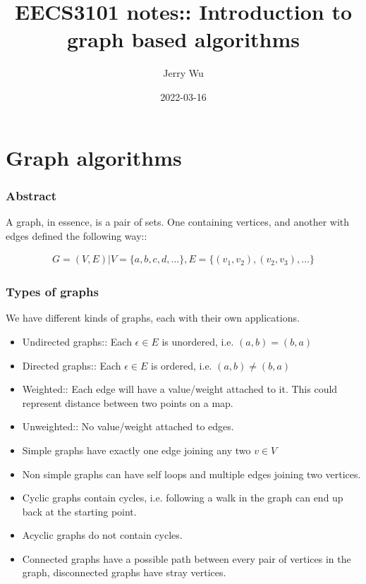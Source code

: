 \documentclass[12pt]{book}
\title{EECS3101 notes:: Introduction to graph based algorithms}
\author{Jerry Wu}
\date{2022-03-16}
\begin{document}
\maketitle

\chapter*{Graph algorithms}

\subsection*{Abstract}

A graph, in essence, is a pair of sets. One containing vertices, and another with edges defined the following way::

\begin{align*}
    G=(V,E)|V=\{a,b,c,d,\ldots\}, E=\{(v_1,v_2),(v_2,v_3),\ldots\}
\end{align*}

\subsection*{Types of graphs}

We have different kinds of graphs, each with their own applications.

\begin{itemize}
    \item Undirected graphs:: Each $\epsilon \in E$ is unordered, i.e. $(a,b)=(b,a)$
    \item Directed graphs:: Each $\epsilon \in E$ is ordered, i.e. $(a,b)\neq (b,a)$
    \item Weighted:: Each edge will have a value/weight attached to it. This could represent distance between two points on a map.
    \item Unweighted:: No value/weight attached to edges.
    \item Simple graphs have exactly one edge joining any two $v\in V$
    \item Non simple graphs can have self loops and multiple edges joining two vertices.
    \item Cyclic graphs contain cycles, i.e. following a walk in the graph can end up back at the starting point.
    \item Acyclic graphs do not contain cycles.
    \item Connected graphs have a possible path between every pair of vertices in the graph, disconnected graphs have stray vertices.
\end{itemize}
\end{document}
